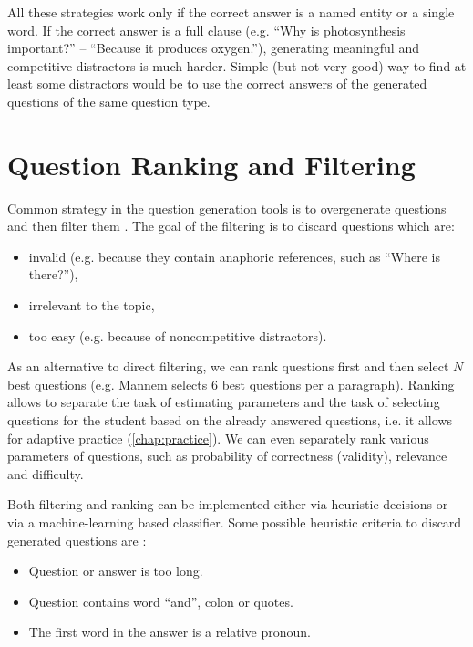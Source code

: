 \documentclass[12pt, twoside]{fithesis2}
\renewcommand{\_}{\leavevmode \kern0.07em\vbox{\hrule width0.4em}}
\newcommand{\squarebullet}{\textcolor{black}{\raisebox{0.15em}{\rule{4pt}{4pt}}}}
\newcommand{\emptysquarebullet}{\textcolor{black}{\raisebox{0.10em}{\tiny$\square$}}}
\newenvironment{myItemize}{
  \begin{itemize}[leftmargin=2em,rightmargin=1em,itemsep=\parskip ,parsep=0em,topsep=0em,partopsep=0em]
  \renewcommand{\labelitemi}{\squarebullet}
  \renewcommand{\labelitemii}{\textbullet}
}{
  \end{itemize}
}
\begin{document}
\noindent
All these strategies work only if the correct answer is a named entity or a single word.
If the correct answer is a full clause
(e.g. ``Why is photosynthesis important?'' -- ``Because it produces oxygen.''),
generating meaningful and competitive distractors is much harder.
Simple (but not very good) way to find at least some distractors would be to use the correct answers of the generated questions of the same question type.


\section{Question Ranking and Filtering}
\label{sec:questions-ranking-filtering}

Common strategy in the question generation tools
is to overgenerate questions and then filter them
\cite{mentor, question-gen-mannem, question-overgenerating-rating, questions-wolfe}.
The goal of the filtering is to discard questions which are:

\begin{myItemize}
  \item invalid (e.g. because they contain anaphoric references, such as ``Where is there?''),
  \item irrelevant to the topic,
  \item too easy (e.g. because of noncompetitive distractors).
\end{myItemize}

As an alternative to direct filtering,
we can rank questions first and then select $N$ best questions
(e.g. Mannem \cite{question-gen-mannem} selects $6$ best questions per a paragraph).
Ranking allows to separate the task of estimating parameters and the task of selecting questions for the student based on the already answered questions,
i.e. it allows for adaptive practice (\autoref{chap:practice}).
We can even separately rank various parameters of questions, such as probability of correctness (validity), relevance and difficulty.

Both filtering and ranking can be implemented either via heuristic decisions
or via a machine-learning based classifier.
Some possible heuristic criteria to discard generated questions are \cite{questions-wolfe}:
\begin{myItemize}
\item Question or answer is too long.
\item Question contains word ``and'', colon or quotes.
\item The first word in the answer is a relative pronoun.
\end{myItemize}
\end{document}
